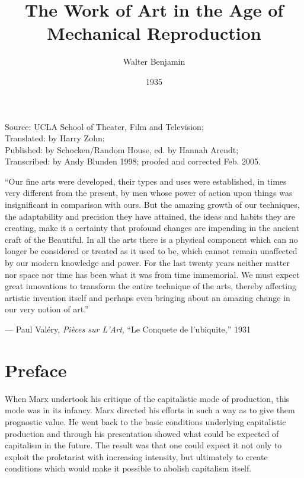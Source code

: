 \documentclass[11pt, letterpaper]{article}
\title{The Work of Art in the Age of Mechanical Reproduction}
\author{Walter Benjamin}
\date{1935}
\begin{document}
\maketitle

\begin{center}
    \small
    Source: UCLA School of Theater, Film and Television;\\
    Translated: by Harry Zohn;\\
    Published: by Schocken/Random House, ed. by Hannah Arendt;\\
    Transcribed: by Andy Blunden 1998; proofed and corrected Feb. 2005.
\end{center}

\vspace{2em}

\setlength{\epigraphwidth}{0.8\textwidth}
\epigraph{
	``Our fine arts were developed, their types and uses were
	established, in times very different from the present, by men whose power of
	action upon things was insignificant in comparison with ours. But the amazing
	growth of our techniques, the adaptability and precision they have attained,
	the ideas and habits they are creating, make it a certainty that profound
	changes are impending in the ancient craft of the Beautiful. In all the arts
	there is a physical component which can no longer be considered or treated as
	it used to be, which cannot remain unaffected by our modern knowledge and
	power. For the last twenty years neither matter nor space nor time has been
	what it was from time immemorial. We must expect great innovations to transform
	the entire technique of the arts, thereby affecting artistic invention itself
	and perhaps even bringing about an amazing change in our very notion of
	art.''}{--- Paul Valéry, \textit{Pièces sur L’Art}, ``Le Conquete de
	l’ubiquite,'' 1931}

\section*{Preface}

When Marx undertook his critique of the capitalistic mode of production, this
mode was in its infancy. Marx directed his efforts in such a way as to give
them prognostic value. He went back to the basic conditions underlying
capitalistic production and through his presentation showed what could be
expected of capitalism in the future. The result was that one could expect it
not only to exploit the proletariat with increasing intensity, but ultimately
to create conditions which would make it possible to abolish capitalism itself.
\end{document}
